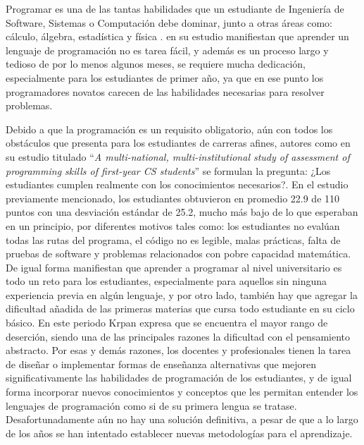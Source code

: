 Programar es una de las tantas habilidades que un estudiante de Ingeniería de Software, Sistemas o Computación debe dominar, junto a otras áreas como: cálculo, álgebra, estadística y física \parencite{Ozmen2014}. \textcite{Tan2009} en su estudio manifiestan que aprender un lenguaje de programación no es tarea fácil, y además es un proceso largo y tedioso de por lo menos algunos meses, se requiere mucha dedicación, especialmente para los estudiantes de primer año, ya que en ese punto los programadores novatos carecen de las habilidades necesarias para resolver problemas.

Debido a que la programación es un requisito obligatorio, aún con todos los obstáculos que presenta para los estudiantes de carreras afines, autores como \textcite{McCracken2001} en su estudio titulado ``\textit{A multi-national, multi-institutional study of assessment of programming skills of first-year CS students}'' se formulan la pregunta: ¿Los estudiantes cumplen realmente con los conocimientos necesarios?. En el estudio previamente mencionado, los estudiantes obtuvieron en promedio 22.9 de 110 puntos con una desviación estándar de 25.2, mucho más bajo de lo que esperaban en un principio, por diferentes motivos tales como: los estudiantes no evalúan todas las rutas del programa, el código no es legible, malas prácticas, falta de pruebas de software y problemas relacionados con pobre capacidad matemática. De igual forma \textcite{Krpan2015} manifiestan que aprender a programar al nivel universitario es todo un reto para los estudiantes, especialmente para aquellos sin ninguna experiencia previa en algún lenguaje, y por otro lado, también hay que agregar la dificultad añadida de las primeras materias que cursa todo estudiante en su ciclo básico. En este periodo Krpan expresa que se encuentra el mayor rango de deserción, siendo una de las principales razones la dificultad con el pensamiento abstracto. Por esas y demás razones, los docentes y profesionales tienen la tarea de diseñar o implementar formas de enseñanza alternativas que mejoren significativamente las habilidades de programación de los estudiantes, y de igual forma incorporar nuevos conocimientos y conceptos que les permitan entender los lenguajes de programación como si de su primera lengua se tratase. Desafortunadamente aún no hay una solución definitiva, a pesar de que a lo largo de los años se han intentado establecer nuevas metodologías para el aprendizaje.

